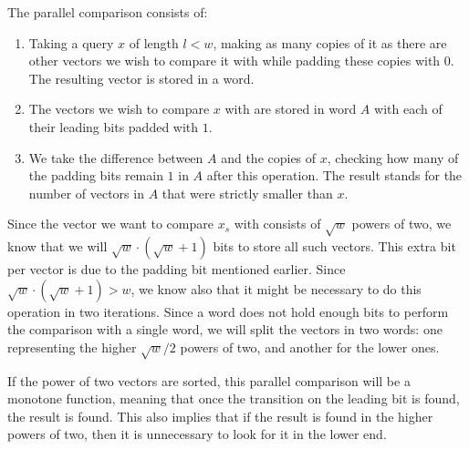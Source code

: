 The parallel comparison consists of:
\begin{enumerate}
    \item
    Taking a query $x$ of length $l < w$, making as many copies of it as there are other vectors we wish to compare it with while padding these copies with $0$. The resulting vector is stored in a word.
    
    \item
    The vectors we wish to compare $x$ with are stored in word $A$ with each of their leading bits padded with $1$.
    
    \item
    We take the difference between $A$ and the copies of $x$, checking how many of the padding bits remain $1$ in $A$ after this operation. The result stands for the number of vectors in $A$ that were strictly smaller than $x$.
\end{enumerate}

Since the vector we want to compare $x_s$ with consists of $\sqrt{w}$ powers of two, we know that we will $\sqrt{w}\cdot(\sqrt{w} + 1)$ bits to store all such vectors. This extra bit per vector is due to the padding bit mentioned earlier. Since $\sqrt{w}\cdot(\sqrt{w} + 1) > w$, we know also that it might be necessary to do this operation in two iterations. Since a word does not hold enough bits to perform the comparison with a single word, we will split the vectors in two words: one representing the higher $\sqrt{w}/2$ powers of two, and another for the lower ones.

If the power of two vectors are sorted, this parallel comparison will be a monotone function, meaning that once the transition on the leading bit is found, the result is found. This also implies that if the result is found in the higher powers of two, then it is unnecessary to look for it in the lower end.

